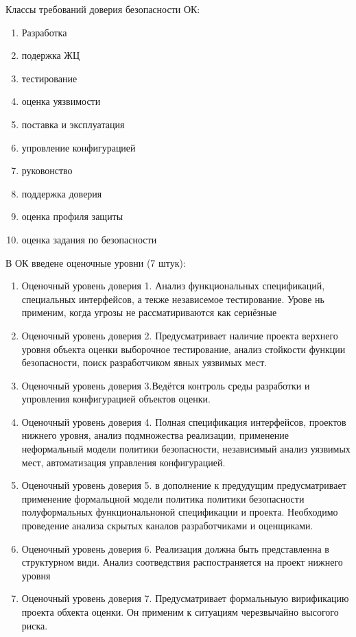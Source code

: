 \documentclass[a4paper,12pt]{extarticle}
\begin{document}
	Классы требований доверия безопасности ОК:
	\begin{enumerate}
		\item Разработка
		\item подержка ЖЦ
		\item тестирование
		\item оценка уязвимости
		\item поставка и эксплуатация
		\item упровление конфигурацией 
		\item руковонство
		\item поддержка доверия
		\item оценка профиля защиты
		\item оценка задания по безопасности
	\end{enumerate}

	В ОК введене оценочные уровни (7 штук):
	\begin{enumerate}
		\item Оценочный уровень доверия 1. Анализ функциональных спецификаций, специальных интерфейсов, а текже независемое тестирование. Урове нь применим, когда угрозы не рассматириваются как сериёзные
		\item Оценочный уровень доверия 2. Предусматривает наличие проекта верхнего уровня объекта оценки выборочное тестирование, анализ стойкости функции безопасности, поиск разработчиком явных уязвимых мест.
		\item Оценочный уровень доверия 3.Ведётся контроль среды разработки и упровления конфигурацией объектов оценки.
		\item Оценочный уровень доверия 4. Полная спецификация интерфейсов, проектов нижнего уровня, анализ подмножества реализации, применение неформальный модели политики безопасности, независимый анализ уязвимых мест, автоматизация управления конфигурацией. 
		\item Оценочный уровень доверия 5. в дополнение к предудущим предусматривает применение формальцной модели политика политики безопасности полуформальных функциональноной спецификации и проекта. Необходимо проведение анализа скрытых каналов разработчиками и оценщиками. 
		\item Оценочный уровень доверия 6. Реализация должна быть представленна в структурном види. Анализ соотведствия распостраняется на проект нижнего уровня
		\item Оценочный уровень доверия 7. Предусматривает формальныую вирификацию проекта обхекта оценки. Он применим к ситуациям черезвычайно высогого риска.
	\end{enumerate}
\end{document}
